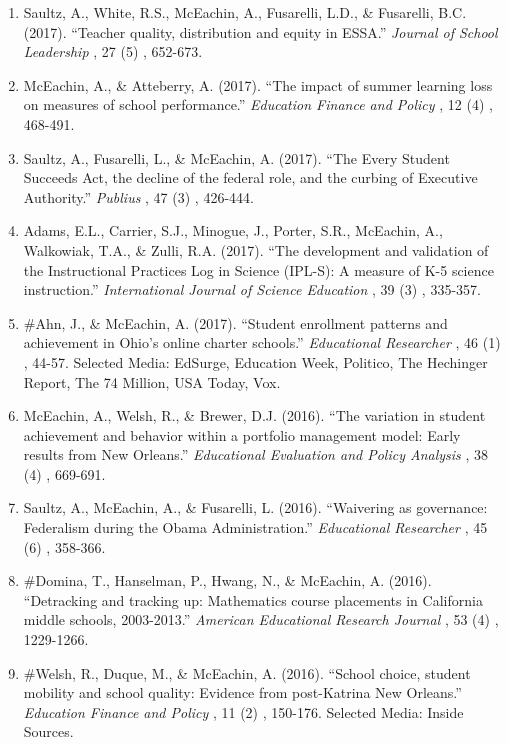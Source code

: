 \documentclass[11pt, letterpaper]{article}
\newcommand*{\revtotal}{0}
\newcommand*{\revarabic}[1]{\number\numexpr\revtotal + 1 - \value{#1}\relax}
\begin{document}
\begin{enumerate}[leftmargin=2em, label=\revarabic*.]
  \item Saultz, A., White, R.S., McEachin, A., Fusarelli, L.D., \& Fusarelli, B.C. (2017).
  ``Teacher quality, distribution and equity in ESSA.''
  \textit{Journal of School Leadership}%
, 27%
(5)%
, 652-673.

  \item McEachin, A., \& Atteberry, A. (2017).
  ``The impact of summer learning loss on measures of school performance.''
  \textit{Education Finance and Policy}%
, 12%
(4)%
, 468-491.

  \item Saultz, A., Fusarelli, L., \& McEachin, A. (2017).
  ``The Every Student Succeeds Act, the decline of the federal role, and the curbing of Executive Authority.''
  \textit{Publius}%
, 47%
(3)%
, 426-444.

  \item Adams, E.L., Carrier, S.J., Minogue, J., Porter, S.R., McEachin, A., Walkowiak, T.A., \& Zulli, R.A. (2017).
  ``The development and validation of the Instructional Practices Log in Science (IPL-S): A measure of K-5 science instruction.''
  \textit{International Journal of Science Education}%
, 39%
(3)%
, 335-357.

  \item \#Ahn, J., \& McEachin, A. (2017).
  ``Student enrollment patterns and achievement in Ohio's online charter schools.''
  \textit{Educational Researcher}%
, 46%
(1)%
, 44-57.
  Selected Media: EdSurge, Education Week, Politico, The Hechinger Report, The 74 Million, USA Today, Vox.

  \item McEachin, A., Welsh, R., \& Brewer, D.J. (2016).
  ``The variation in student achievement and behavior within a portfolio management model: Early results from New Orleans.''
  \textit{Educational Evaluation and Policy Analysis}%
, 38%
(4)%
, 669-691.

  \item Saultz, A., McEachin, A., \& Fusarelli, L. (2016).
  ``Waivering as governance: Federalism during the Obama Administration.''
  \textit{Educational Researcher}%
, 45%
(6)%
, 358-366.

  \item \#Domina, T., Hanselman, P., Hwang, N., \& McEachin, A. (2016).
  ``Detracking and tracking up: Mathematics course placements in California middle schools, 2003-2013.''
  \textit{American Educational Research Journal}%
, 53%
(4)%
, 1229-1266.

  \item \#Welsh, R., Duque, M., \& McEachin, A. (2016).
  ``School choice, student mobility and school quality: Evidence from post-Katrina New Orleans.''
  \textit{Education Finance and Policy}%
, 11%
(2)%
, 150-176.
  Selected Media: Inside Sources.


\end{enumerate}
\end{document}
